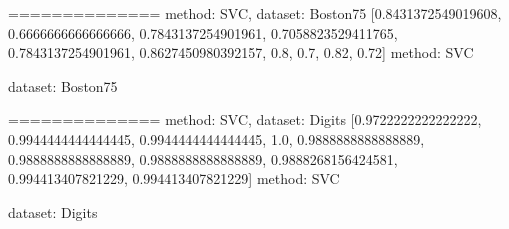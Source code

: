 \documentclass{article}
\begin{document}
\begin{center}
\end{center}
==============
method: SVC, dataset: Boston75
[0.8431372549019608, 0.6666666666666666, 0.7843137254901961, 0.7058823529411765, 0.7843137254901961, 0.8627450980392157, 0.8, 0.7, 0.82, 0.72]
\newline
\newline
\noindent method: SVC
\newline
\newline

\noindent dataset: Boston75
\newline
\newline

\begin{center}
\end{center}
==============
method: SVC, dataset: Digits
[0.9722222222222222, 0.9944444444444445, 0.9944444444444445, 1.0, 0.9888888888888889, 0.9888888888888889, 0.9888888888888889, 0.9888268156424581, 0.994413407821229, 0.994413407821229]
\newline
\newline
\noindent method: SVC
\newline
\newline

\noindent dataset: Digits
\newline
\newline
\end{document}
